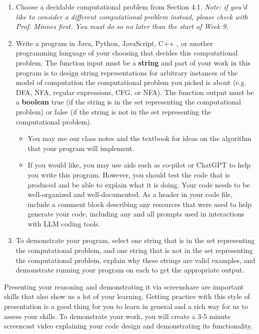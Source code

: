 \begin{enumerate}
\item Choose a decidable computational problem from Section 4.1. 
{\it Note:
if you'd like to consider a different computational problem instead, please check with Prof. Minnes first. You must do so no later than the start of Week 9.}
\item Write a program in Java, Python, JavaScript, C++ , or another programming language of your choosing that decides this computational problem.  The function input must be a {\bf string} and part of your work in this program 
is to design string representations for arbitrary instances of the model of 
computation the computational problem you picked is about (e.g. DFA, NFA, regular expressions, CFG, or NFA). The function output must be a {\bf boolean} 
true (if the string is in the set representing the computational problem) or 
false (if the string is not in the set representing the computational problem).
\begin{itemize}
   \item You may use our class notes and the textbook for ideas on the algorithm that your program will implement.
   \item If you would like, you may use aids such as co-pilot or ChatGPT to help you write this program. 
   However, you should test the code that is produced and be able to explain what it is doing. Your code needs to be well-organized and well-documented.
   As a header in your code file, include a comment block describing any resources that were used to 
   help generate your code, including any and all prompts used in interactions 
   with LLM coding tools.
\end{itemize}

\item To demonstrate your program, select one string that is in the 
set representing the computational problem, and one string that is not in the 
set representing the computational problem, explain why these strings are valid
examples, and demonstrate running your program on each to get the appropriate 
output.
\end{enumerate}

Presenting your reasoning and demonstrating it via screenshare are important 
skills that also  show us a lot of your learning. Getting practice with this 
style of presentation is a good thing  for you to learn in general and a rich 
way for us to assess your skills. 
To demonstrate your work, you will create a 3-5 minute screencast video 
explaining your code design and demonstrating its functionality.

